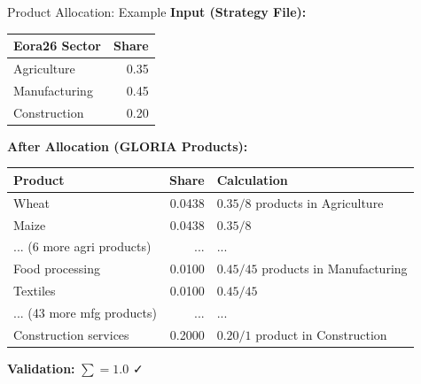 \documentclass[10pt]{beamer}
\begin{document}
\begin{frame}[fragile]{Product Allocation: Example}
\textbf{Input (Strategy File):}

\vspace{0.2cm}

\begin{table}[h]
\centering
\small
\begin{tabular}{lr}
\toprule
\textbf{Eora26 Sector} & \textbf{Share} \\
\midrule
Agriculture & 0.35 \\
Manufacturing & 0.45 \\
Construction & 0.20 \\
\bottomrule
\end{tabular}
\end{table}

\vspace{0.3cm}

\textbf{After Allocation (GLORIA Products):}

\vspace{0.2cm}

\begin{table}[h]
\centering
\footnotesize
\begin{tabular}{lrl}
\toprule
\textbf{Product} & \textbf{Share} & \textbf{Calculation} \\
\midrule
Wheat & 0.0438 & $0.35 / 8$ products in Agriculture \\
Maize & 0.0438 & $0.35 / 8$ \\
... (6 more agri products) & ... & ... \\
Food processing & 0.0100 & $0.45 / 45$ products in Manufacturing \\
Textiles & 0.0100 & $0.45 / 45$ \\
... (43 more mfg products) & ... & ... \\
Construction services & 0.2000 & $0.20 / 1$ product in Construction \\
\bottomrule
\end{tabular}
\end{table}

\textbf{Validation:} $\sum = 1.0$ ✓
\end{frame}
\end{document}
